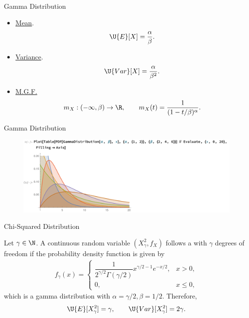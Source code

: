 \begin{frame}{Gamma Distribution}

\justifying
{} 
\begin{itemize}
	\justifying
	\item \underline{Mean}. 
	\begin{align*}
	\U{E}[X] = \frac{\alpha}{\beta}.
	\end{align*}
	\item \underline{Variance}.
	\begin{align*}
	\U{Var}[X] = \frac{\alpha}{\beta^2}.
	\end{align*}
	\item \underline{M.G.F.}
	\begin{align*}
	m_X: (-\infty, \beta) \rightarrow \R, \qquad m_X(t) = \frac{1}{(1-t/\beta)^{\alpha}}.
	\end{align*}
\end{itemize}

\end{frame}

\begin{frame}{Gamma Distribution}

\begin{figure}[htbp]
	\centering
	\includegraphics[width=\linewidth]{./images/rc2fig3.pdf}
\end{figure}

\end{frame}

\begin{frame}{Chi-Squared Distribution}

\justifying
{} Let $\gamma\in \N$. A continuous random variable $(X_{\gamma}^2, f_X)$ follows a  with $\gamma$ degrees of freedom if the probability density function is given by
\begin{align*}
f_{\gamma}(x) = \left\{
\begin{array}{ll}
\dfrac{1}{2^{\gamma/2}\Gamma(\gamma/2)} x^{\gamma/2-1} e^{-x/2}, & x > 0, \\
0, & x\leq 0,
\end{array}
\right.
\end{align*}
which is a gamma distribution with $\alpha = \gamma/2, \beta = 1/2$. Therefore,
\begin{align*}
\U{E}[X^2_{\gamma}] = \gamma, \qquad \U{Var}[X_{\gamma}^2] = 2\gamma.
\end{align*}


\end{frame}


